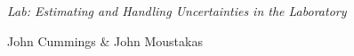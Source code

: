 {\LARGE {\em \noindent Lab: Estimating and Handling Uncertainties in the Laboratory}}

\large{\noindent John Cummings \& John Moustakas}

